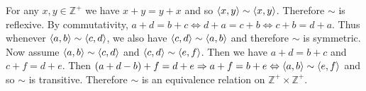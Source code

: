 \documentclass[11pt]{book}
\begin{document}
\begin{enumerate}
{For any $x,y\in\mathbb{Z}^+$ we have $x+y=y+x$ and so $\langle x,y\rangle\sim\langle x,y\rangle$. Therefore $\sim$ is reflexive. By commutativity, $a+d=b+c \iff d+a=c+b \iff c+b=d+a$. Thus whenever $\langle a,b\rangle\sim\langle c,d\rangle$, we also have $\langle c,d\rangle\sim\langle a,b\rangle$ and therefore $\sim$ is symmetric. Now assume $\langle a,b\rangle\sim\langle c,d\rangle$ and $\langle c,d\rangle\sim\langle e,f\rangle$. Then we have $a+d=b+c$ and $c+f=d+e$. Then $(a+d-b)+f=d+e \Rightarrow a+f=b+e \Leftrightarrow \langle a,b\rangle\sim\langle e,f\rangle$ and so $\sim$ is transitive. Therefore $\sim$ is an equivalence relation on $\mathbb{Z}^+\times\mathbb{Z}^+$.}

\end{enumerate}

\hrulefill
\end{document}

